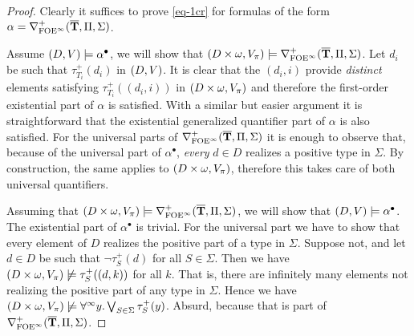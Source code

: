 \begin{proof}
Clearly it suffices to prove \eqref{eq-1cr} for formulas of the form
$\alpha = \nabla^+_{{\mathrm{FOE}}^\infty}(\overline{{\mathbf{T}}},\Pi,\Sigma)$.
\smallskip

\noindent\fbox{$\Rightarrow$} 
Assume $(D,V) \models \alpha^{\bullet}$, we will show that 
$(D\times \omega,V_\pi) \models \nabla^+_{{\mathrm{FOE}}^\infty}(\overline{{\mathbf{T}}},\Pi,\Sigma)$.
Let $d_i$ be such that $\tau_{T_i}^+(d_i)$ in $(D,V)$. 
It is clear that the $(d_i,i)$ provide \emph{distinct} elements satisfying 
$\tau_{T_i}^+((d_i,i))$ in $(D\times\omega,V_{\pi})$ and therefore the 
first-order existential part of $\alpha$ is satisfied. 
With a similar but easier argument it is straightforward that the existential 
generalized quantifier part of $\alpha$ is also satisfied.
%
For the universal parts of $\nabla^+_{{\mathrm{FOE}}^\infty}(\overline{{\mathbf{T}}},\Pi,\Sigma)$ it is enough to observe that, because of the universal part of $\alpha^\bullet$, \emph{every} $d\in D$ realizes a positive type in $\Sigma$. By construction, the same applies to $(D\times\omega,V_{\pi})$, 
therefore this takes care of both universal quantifiers.
\medskip
		
\noindent\fbox{$\Leftarrow$} 
Assuming that $(D\times \omega,V_\pi) \models 
\nabla^+_{{\mathrm{FOE}}^\infty}(\overline{{\mathbf{T}}},\Pi,\Sigma)$,
we will show that $(D,V) \models \alpha^\bullet$. 
The existential part of $\alpha^{\bullet}$ is trivial. 
For the universal part we have to show that every element of $D$ realizes the 
positive part of a type in $\Sigma$. 
Suppose not, and let $d\in D$ be such that $\lnot\tau_S^+(d)$ for all $S\in 
\Sigma$. 
Then we have $(D\times\omega,V_\pi) \not\models \tau_S^+((d,k))$ for all $k$.
That is, there are infinitely many elements not realizing the positive part of 
any type in $\Sigma$. 
Hence we have $(D\times\omega,V_\pi) \not\models \forall^\infty y.\bigvee_{S\in\Sigma} 
\tau_S^+(y)$. 
Absurd, because that is part of $\nabla^+_{{\mathrm{FOE}}^\infty}(\overline{{\mathbf{T}}},\Pi,\Sigma)$.
\end{proof}

